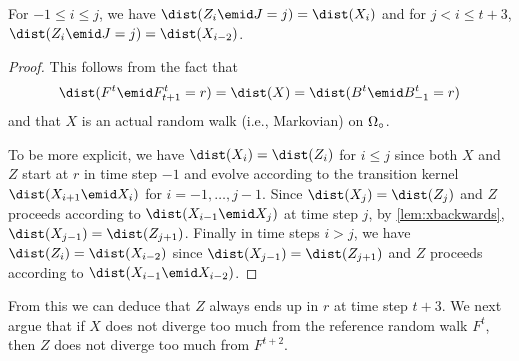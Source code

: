 \begin{lemma}
\label{lem:ydist}
For $-1\le i\le j$, we have 
$\dist(Z_i\emid J=j) = \dist(X_i)$ and for 
$j< i \le t + 3$,
$\dist(Z_i\emid J=j) = \dist(X_{i-2})$.
\end{lemma}
\begin{proof}
This follows from the fact that 
\begin{align*}
\dist(F^t \emid F^t_{t+1} = r) = \dist(X)
    = \dist(B^t \emid B^t_{-1} = r)
\end{align*}
and that $X$ is an actual random walk (i.e., Markovian)
on $\Omega_\circ$.

To be more explicit, we have $\dist(X_i)=\dist(Z_i)$ for 
$i\le j$ since both $X$ and $Z$ start at $r$ in time step 
$-1$ and evolve according to the transition kernel
$\dist(X_{i+1}\emid X_i)$ for $i=-1,\ldots, j-1$. Since
$\dist(X_j) = \dist(Z_j)$ and $Z$ proceeds according to
$\dist(X_{i-1}\emid X_j)$ at time step $j$, by 
\autoref{lem:xbackwards}, $\dist(X_{j-1}) = \dist(Z_{j+1})$.
%
Finally in time steps $i>j$, we have $\dist(Z_i)=\dist(X_{i-2})$
since $\dist(X_{j-1}) = \dist(Z_{j+1})$ and $Z$ proceeds according
to $\dist(X_{i-1}\emid X_{i-2})$.
\end{proof}

From this we can deduce that $Z$ always
ends up in $r$ at time step $t+3$. We next
argue that if $X$ does not diverge too much from
the reference random walk $F^t$, then $Z$ does 
not diverge too much from $F^{t+2}$.

